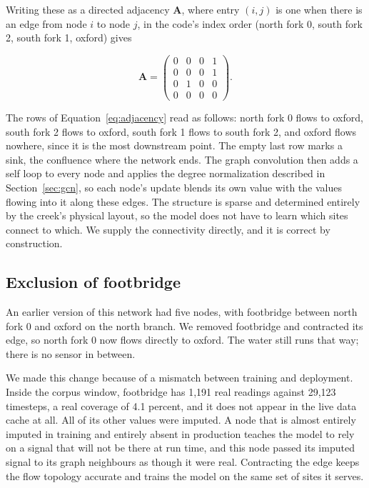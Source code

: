 \documentclass{article}
\begin{document}
Writing these as a directed adjacency $\mathbf{A}$, where entry $(i,j)$ is one
when there is an edge from node $i$ to node $j$, in the code's index order (north
fork 0, south fork 2, south fork 1, oxford) gives

\begin{equation}
  \label{eq:adjacency}
  \mathbf{A} =
  \begin{pmatrix}
    0 & 0 & 0 & 1 \\
    0 & 0 & 0 & 1 \\
    0 & 1 & 0 & 0 \\
    0 & 0 & 0 & 0
  \end{pmatrix}.
\end{equation}

The rows of Equation~\ref{eq:adjacency} read as follows: north fork 0 flows to
oxford, south fork 2 flows to oxford, south fork 1 flows to south fork 2, and
oxford flows nowhere, since it is the most downstream point. The empty last row
marks a sink, the confluence where the network ends. The graph convolution then
adds a self loop to every node and applies the degree normalization described
in Section~\ref{sec:gcn}, so each node's update blends its own value with the
values flowing into it along these edges. The structure is sparse and
determined entirely by the creek's physical layout, so the model does not have
to learn which sites connect to which. We supply the connectivity directly, and
it is correct by construction.

\subsection{Exclusion of footbridge}
\label{sec:footbridge}

An earlier version of this network had five nodes, with footbridge between
north fork 0 and oxford on the north branch. We removed footbridge and
contracted its edge, so north fork 0 now flows directly to oxford. The water
still runs that way; there is no sensor in between.

We made this change because of a mismatch between training and deployment.
Inside the corpus window, footbridge has 1,191 real readings against 29,123
timesteps, a real coverage of 4.1 percent, and it does not appear in the live
data cache at all. All of its other values were imputed. A node that is almost
entirely imputed in training and entirely absent in production teaches the
model to rely on a signal that will not be there at run time, and this node
passed its imputed signal to its graph neighbours as though it were real.
Contracting the edge keeps the flow topology accurate and trains the model on
the same set of sites it serves.
\end{document}
